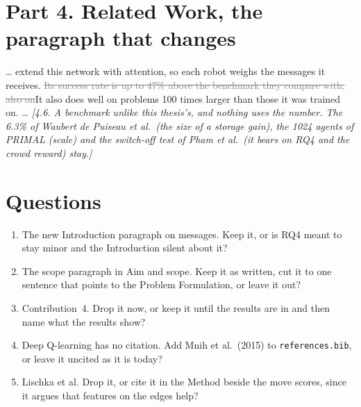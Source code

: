 \documentclass[11pt,a4paper]{article}
\newcommand{\new}[1]{\textcolor{newc}{#1}}
\newcommand{\old}[1]{\textcolor{gray}{\sout{#1}}}
\newcommand{\note}[1]{{\small\itshape [#1]}}
\newcommand{\lab}[1]{\textsf{\footnotesize\detokenize{#1}}}
\newcommand{\citet}[1]{\lab{#1}}
\begin{document}
\section*{Part 4. Related Work, the paragraph that changes}

\ldots \citet{li2021magat} extend this network with attention, so each robot
weighs the messages it receives. \old{Its success rate is up to 47\% above
the benchmark they compare with, also on}\new{It also does well on} problems
100 times larger than those it was trained on. \ldots
\note{4.6. A benchmark unlike this thesis's, and nothing uses the number.
The 6.3\% of Waubert de Puiseau et al.\ (the size of a storage gain), the
1024 agents of PRIMAL (scale) and the switch-off test of Pham et al.\ (it
bears on RQ4 and the crowd reward) stay.}

\section*{Questions}
\begin{enumerate}[nosep]
  \item The new Introduction paragraph on messages. Keep it, or is RQ4 meant
    to stay minor and the Introduction silent about it?
  \item The scope paragraph in Aim and scope. Keep it as written, cut it to
    one sentence that points to the Problem Formulation, or leave it out?
  \item Contribution~4. Drop it now, or keep it until the results are in and
    then name what the results show?
  \item Deep Q-learning has no citation. Add Mnih et al.\ (2015) to
    \texttt{references.bib}, or leave it uncited as it is today?
  \item Lischka et al. Drop it, or cite it in the Method beside the move
    scores, since it argues that features on the edges help?
\end{enumerate}
\end{document}

